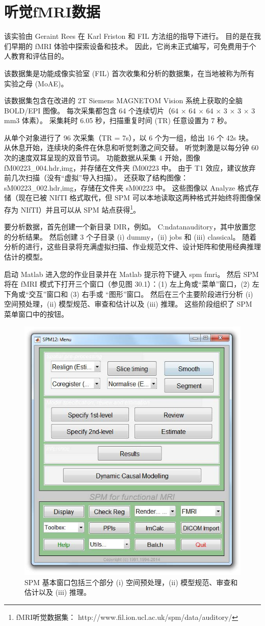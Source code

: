 \chapter{听觉fMRI数据}

该实验由 Geraint Rees 在 Karl Friston 和 FIL 方法组的指导下进行。 目的是在我们早期的 fMRI 体验中探索设备和技术。 因此，它尚未正式编写，可免费用于个人教育和评估目的。

该数据集是功能成像实验室 (FIL) 首次收集和分析的数据集，在当地被称为所有实验之母 (MoAE)。

该数据集包含在改进的 2T Siemens MAGNETOM Vision 系统上获取的全脑 BOLD/EPI 图像。 每次采集都包含 64 个连续切片（64 $\times$ 64 $\times$ 64 $\times$ 3 $\times$ 3 $\times$ 3 mm3 体素）。 采集耗时 6.05 秒，扫描重复时间 (TR) 任意设置为 7 秒。

从单个对象进行了 96 次采集（TR = 7s），以 6 个为一组，给出 16 个 42s 块。 从休息开始，连续块的条件在休息和听觉刺激之间交替。 听觉刺激是以每分钟 60 次的速度双耳呈现的双音节词。 功能数据从采集 4 开始，图像 fM00223\_004.{hdr,img}，并存储在文件夹 fM00223 中。 由于 T1 效应，建议放弃前几次扫描（没有“虚拟”导入扫描）。 还获取了结构图像：sM00223\_002.{hdr,img}，存储在文件夹 sM00223 中。 这些图像以 Analyze 格式存储（现在已被 NIfTI 格式取代，但 SPM 可以本地读取这两种格式并始终将图像保存为 NIfTI）并且可以从 SPM 站点获得\footnote{fMRI听觉数据集： http://www.fil.ion.ucl.ac.uk/spm/data/auditory/}。

要分析数据，首先创建一个新目录 DIR，例如。 C:ndatanauditory，其中放置您的分析结果。 然后创建 3 个子目录 (i) dummy，(ii) jobs 和 (iii) classical。 随着分析的进行，这些目录将充满虚拟扫描、作业规范文件、设计矩阵和使用经典推理估计的模型。

启动 Matlab 进入您的作业目录并在 Matlab 提示符下键入 spm fmri。 然后 SPM 将在 fMRI 模式下打开三个窗口（参见图 30.1）：(1) 左上角或“菜单”窗口，(2) 左下角或“交互”窗口和 (3) 右手或 “图形”窗口。 然后在三个主要阶段进行分析 (i) 空间预处理，(ii) 模型规范、审查和估计以及 (iii) 推理。 这些阶段组织了 SPM 菜单窗口中的按钮。

\begin{figure}[htbp]
	\centering
	\includegraphics[width=0.6\linewidth]{part7/figs/fig_30_1}
	\caption{SPM 基本窗口包括三个部分 (i) 空间预处理，(ii) 模型规范、审查和估计以及 (iii) 推理。}
	\label{localizing}
\end{figure}

